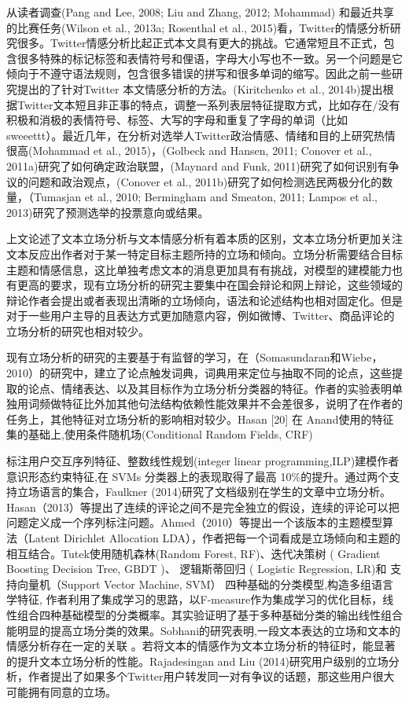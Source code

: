 从读者调查(Pang and Lee, 2008; Liu and Zhang, 2012; Mohammad) 和最近共享的比赛任务(Wilson et al., 2013a; Rosenthal et al., 2015)看，Twitter的情感分析研究很多。Twitter情感分析比起正式本文具有更大的挑战。它通常短且不正式，包含很多特殊的标记标签和表情符号和俚语，字母大小写也不一致。另一个问题是它倾向于不遵守语法规则，包含很多错误的拼写和很多单词的缩写。因此之前一些研究提出的了针对Twitter 本文情感分析的方法。(Kiritchenko et al., 2014b)提出根据Twitter文本短且非正事的特点，调整一系列表层特征提取方式，比如存在/没有积极和消极的表情符号、标签、大写的字母和重复了字母的单词（比如sweeettt）。最近几年，在分析对选举人Twitter政治情感、情绪和目的上研究热情很高(Mohammad et al., 2015)，(Golbeck and Hansen, 2011; Conover et al., 2011a)研究了如何确定政治联盟，(Maynard and Funk, 2011)研究了如何识别有争议的问题和政治观点，(Conover et al., 2011b)研究了如何检测选民两极分化的数量，（Tumasjan et al., 2010; Bermingham and Smeaton, 2011; Lampos et al., 2013)研究了预测选举的投票意向或结果。


上文论述了文本立场分析与文本情感分析有着本质的区别，文本立场分析更加关注文本反应出作者对于某一特定目标主题所持的立场和倾向。立场分析需要结合目标主题和情感信息，这比单独考虑文本的消息更加具有有挑战，对模型的建模能力也有更高的要求，现有立场分析的研究主要集中在国会辩论和网上辩论，这些领域的辩论作者会提出或者表现出清晰的立场倾向，语法和论述结构也相对固定化。但是对于一些用户主导的且表达方式更加随意内容，例如微博、Twitter、商品评论的立场分析的研究也相对较少。

现有立场分析的研究的主要基于有监督的学习，在（Somasundaran和Wiebe，2010）的研究中，建立了论点触发词典，词典用来定位与抽取不同的论点，这些提取的论点、情绪表达、以及其目标作为立场分析分类器的特征。作者的实验表明单独用词频做特征比外加其他句法结构依赖性能效果并不会差很多，说明了在作者的任务上，其他特征对立场分析的影响相对较少。Hasan [20] 在 Anand使用的特征集的基础上,使用条件随机场(Conditional Random Fields, CRF)

标注用户交互序列特征、整数线性规划(integer linear programming,ILP)建模作者意识形态约束特征,在 SVMs 分类器上的表现取得了最高 10\%的提升。通过两个支持立场语言的集合，Faulkner (2014)研究了文档级别在学生的文章中立场分析。Hasan（2013）等提出了连续的评论之间不是完全独立的假设，连续的评论可以把问题定义成一个序列标注问题。Ahmed（2010）等提出一个该版本的主题模型算法（Latent Dirichlet Allocation LDA），作者把每一个词看成是立场倾向和主题的相互结合。Tutek使用随机森林(Random Forest, RF)、迭代决策树 ( Gradient Boosting Decision Tree, GBDT )、 逻辑斯蒂回归 ( Logistic Regression, LR)和 支持向量机（Support Vector Machine, SVM） 四种基础的分类模型,构造多组语言学特征, 作者利用了集成学习的思路，以F-measure作为集成学习的优化目标，线性组合四种基础模型的分类概率。其实验证明了基于多种基础分类的输出线性组合能明显的提高立场分类的效果。Sobhani的研究表明,一段文本表达的立场和文本的情感分析存在一定的关联 。若将文本的情感作为文本立场分析的特征时，能显著的提升文本立场分析的性能。Rajadesingan and Liu (2014)研究用户级别的立场分析，作者提出了如果多个Twitter用户转发同一对有争议的话题，那这些用户很大可能拥有同意的立场。

